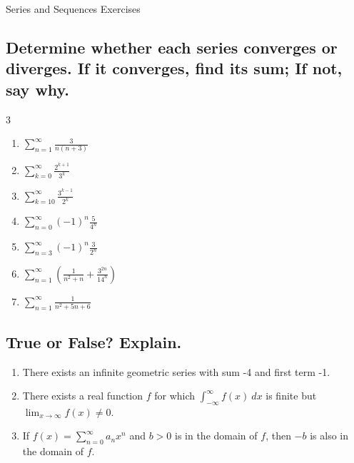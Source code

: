 \documentclass{article}
\begin{document}
\begin{center}
\begin{Huge}Series and Sequences Exercises\end{Huge}
\end{center}


\subsection{Determine whether each series converges or diverges. If it converges, find its sum; If not, say why.}

\begin{multicols}{3}
\begin{enumerate}
\item $\displaystyle \sum_{n=1}^\infty \frac{3}{n(n+3)}$
\item $\displaystyle \sum_{k=0}^{\infty} \frac{2^{k+1}}{3^k}$
\item $\displaystyle \sum_{k=10}^{\infty} \frac{3^{k-1}}{2^k}$
\item $\displaystyle \sum_{n=0}^{\infty}(-1)^n \frac{5}{4^n}$
\item $\displaystyle \sum_{n=3}^{\infty}(-1)^n \frac{3}{2^n}$
\item $\displaystyle \sum_{n=1}^{\infty}\left( \frac{1}{n^2+n} + \frac{3^{2n}}{14^n}\right)$
\item $\displaystyle\sum_{n=1}^{\infty}\frac{1}{n^{2}+5n+6}$
\end{enumerate}
\end{multicols}

\subsection{True or False? Explain.}
\begin{enumerate}
\item There exists an infinite geometric series with sum -4 and first term -1.
\item There exists a real function $f$ for which $\displaystyle\int_{-\infty}^\infty f(x) \ dx$ is finite but $\displaystyle\lim_{x\to\infty} f(x) \neq 0$.
\item If $\displaystyle f(x)=\sum_{n=0}^\infty a_n x^n$ and $b>0$ is in the domain of $f$, then $-b$ is also in the domain of $f$.
\end{enumerate}
\end{document}
